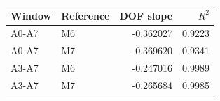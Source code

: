 \begin{tabular}{@{}llrr@{}}
\toprule
Window & Reference & DOF slope & $R^2$\\
\midrule
A0-A7 & M6 & -0.362027 & 0.9223\\
A0-A7 & M7 & -0.369620 & 0.9341\\
A3-A7 & M6 & -0.247016 & 0.9989\\
A3-A7 & M7 & -0.265684 & 0.9985\\
\bottomrule
\end{tabular}
